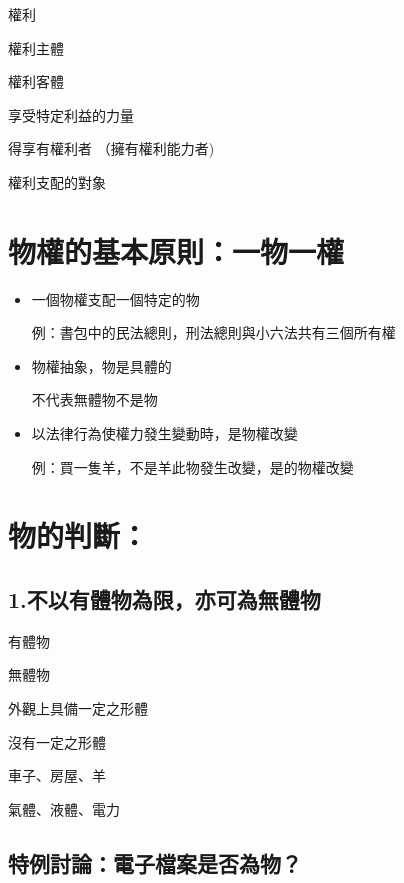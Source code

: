 \documentclass[
]{book}
\begin{document}
權利

權利主體

權利客體

享受特定利益的力量

得享有權利者
（擁有權利能力者)

權利支配的對象

\hypertarget{ux7269ux6b0aux7684ux57faux672cux539fux5247ux4e00ux7269ux4e00ux6b0a}{%
\section{物權的基本原則：一物一權}\label{ux7269ux6b0aux7684ux57faux672cux539fux5247ux4e00ux7269ux4e00ux6b0a}}

\begin{itemize}
\item
  一個物權支配一個特定的物

  例：書包中的民法總則，刑法總則與小六法共有三個所有權
\item
  物權抽象，物是具體的

  不代表無體物不是物
\item
  以法律行為使權力發生變動時，是物權改變

  例：買一隻羊，不是羊此物發生改變，是的物權改變
\end{itemize}

\pagebreak

\hypertarget{ux7269ux7684ux5224ux65b7}{%
\section{物的判斷：}\label{ux7269ux7684ux5224ux65b7}}

\hypertarget{ux4e0dux4ee5ux6709ux9ad4ux7269ux70baux9650ux4ea6ux53efux70baux7121ux9ad4ux7269}{%
\subsection{1.不以有體物為限，亦可為無體物}\label{ux4e0dux4ee5ux6709ux9ad4ux7269ux70baux9650ux4ea6ux53efux70baux7121ux9ad4ux7269}}

有體物

無體物

外觀上具備一定之形體

沒有一定之形體

車子、房屋、羊

氣體、液體、電力

\hypertarget{ux7279ux4f8bux8a0eux8ad6ux96fbux5b50ux6a94ux6848ux662fux5426ux70baux7269}{%
\subsection{特例討論：電子檔案是否為物？}\label{ux7279ux4f8bux8a0eux8ad6ux96fbux5b50ux6a94ux6848ux662fux5426ux70baux7269}}
\end{document}
